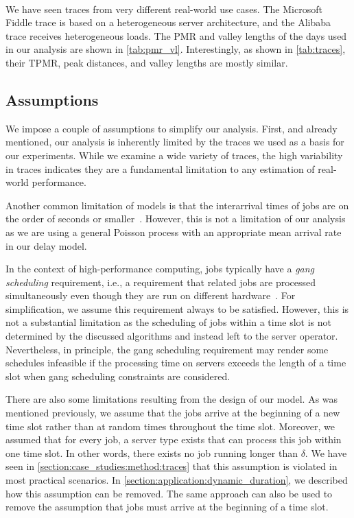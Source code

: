 \paragraph{} We have seen traces from very different real-world use cases. The Microsoft Fiddle trace is based on a heterogeneous server architecture, and the Alibaba trace receives heterogeneous loads. The PMR and valley lengths of the days used in our analysis are shown in \cref{tab:pmr_vl}. Interestingly, as shown in \cref{tab:traces}, their TPMR, peak distances, and valley lengths are mostly similar.

\subsection{Assumptions}

We impose a couple of assumptions to simplify our analysis. First, and already mentioned, our analysis is inherently limited by the traces we used as a basis for our experiments. While we examine a wide variety of traces, the high variability in traces indicates they are a fundamental limitation to any estimation of real-world performance.

Another common limitation of models is that the interarrival times of jobs are on the order of seconds or smaller~\cite{Amvrosiadis2018}. However, this is not a limitation of our analysis as we are using a general Poisson process with an appropriate mean arrival rate in our delay model.

In the context of high-performance computing, jobs typically have a \emph{gang scheduling} requirement, i.e., a requirement that related jobs are processed simultaneously even though they are run on different hardware~\cite{Amvrosiadis2018}. For simplification, we assume this requirement always to be satisfied. However, this is not a substantial limitation as the scheduling of jobs within a time slot is not determined by the discussed algorithms and instead left to the server operator. Nevertheless, in principle, the gang scheduling requirement may render some schedules infeasible if the processing time on servers exceeds the length of a time slot when gang scheduling constraints are considered.

There are also some limitations resulting from the design of our model. As was mentioned previously, we assume that the jobs arrive at the beginning of a new time slot rather than at random times throughout the time slot. Moreover, we assumed that for every job, a server type exists that can process this job within one time slot. In other words, there exists no job running longer than $\delta$. We have seen in \cref{section:case_studies:method:traces} that this assumption is violated in most practical scenarios. In \cref{section:application:dynamic_duration}, we described how this assumption can be removed. The same approach can also be used to remove the assumption that jobs must arrive at the beginning of a time slot.

